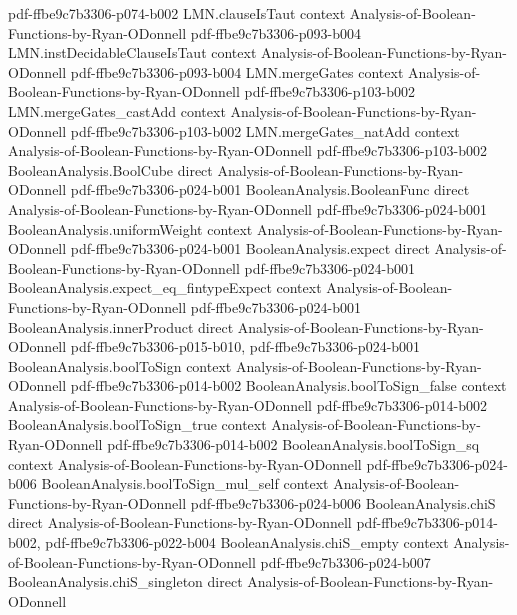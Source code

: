 \begin{theorem}
  {pdf-ffbe9c7b3306-p074-b002}
\proofstep
  {LMN.clauseIsTaut}
  {context}
  {Analysis-of-Boolean-Functions-by-Ryan-ODonnell}
  {pdf-ffbe9c7b3306-p093-b004}
\proofstep
  {LMN.instDecidableClauseIsTaut}
  {context}
  {Analysis-of-Boolean-Functions-by-Ryan-ODonnell}
  {pdf-ffbe9c7b3306-p093-b004}
\proofstep
  {LMN.mergeGates}
  {context}
  {Analysis-of-Boolean-Functions-by-Ryan-ODonnell}
  {pdf-ffbe9c7b3306-p103-b002}
\proofstep
  {LMN.mergeGates_castAdd}
  {context}
  {Analysis-of-Boolean-Functions-by-Ryan-ODonnell}
  {pdf-ffbe9c7b3306-p103-b002}
\proofstep
  {LMN.mergeGates_natAdd}
  {context}
  {Analysis-of-Boolean-Functions-by-Ryan-ODonnell}
  {pdf-ffbe9c7b3306-p103-b002}
\proofstep
  {BooleanAnalysis.BoolCube}
  {direct}
  {Analysis-of-Boolean-Functions-by-Ryan-ODonnell}
  {pdf-ffbe9c7b3306-p024-b001}
\proofstep
  {BooleanAnalysis.BooleanFunc}
  {direct}
  {Analysis-of-Boolean-Functions-by-Ryan-ODonnell}
  {pdf-ffbe9c7b3306-p024-b001}
\proofstep
  {BooleanAnalysis.uniformWeight}
  {context}
  {Analysis-of-Boolean-Functions-by-Ryan-ODonnell}
  {pdf-ffbe9c7b3306-p024-b001}
\proofstep
  {BooleanAnalysis.expect}
  {direct}
  {Analysis-of-Boolean-Functions-by-Ryan-ODonnell}
  {pdf-ffbe9c7b3306-p024-b001}
\proofstep
  {BooleanAnalysis.expect_eq_fintypeExpect}
  {context}
  {Analysis-of-Boolean-Functions-by-Ryan-ODonnell}
  {pdf-ffbe9c7b3306-p024-b001}
\proofstep
  {BooleanAnalysis.innerProduct}
  {direct}
  {Analysis-of-Boolean-Functions-by-Ryan-ODonnell}
  {pdf-ffbe9c7b3306-p015-b010,
    pdf-ffbe9c7b3306-p024-b001}
\proofstep
  {BooleanAnalysis.boolToSign}
  {context}
  {Analysis-of-Boolean-Functions-by-Ryan-ODonnell}
  {pdf-ffbe9c7b3306-p014-b002}
\proofstep
  {BooleanAnalysis.boolToSign_false}
  {context}
  {Analysis-of-Boolean-Functions-by-Ryan-ODonnell}
  {pdf-ffbe9c7b3306-p014-b002}
\proofstep
  {BooleanAnalysis.boolToSign_true}
  {context}
  {Analysis-of-Boolean-Functions-by-Ryan-ODonnell}
  {pdf-ffbe9c7b3306-p014-b002}
\proofstep
  {BooleanAnalysis.boolToSign_sq}
  {context}
  {Analysis-of-Boolean-Functions-by-Ryan-ODonnell}
  {pdf-ffbe9c7b3306-p024-b006}
\proofstep
  {BooleanAnalysis.boolToSign_mul_self}
  {context}
  {Analysis-of-Boolean-Functions-by-Ryan-ODonnell}
  {pdf-ffbe9c7b3306-p024-b006}
\proofstep
  {BooleanAnalysis.chiS}
  {direct}
  {Analysis-of-Boolean-Functions-by-Ryan-ODonnell}
  {pdf-ffbe9c7b3306-p014-b002,
    pdf-ffbe9c7b3306-p022-b004}
\proofstep
  {BooleanAnalysis.chiS_empty}
  {context}
  {Analysis-of-Boolean-Functions-by-Ryan-ODonnell}
  {pdf-ffbe9c7b3306-p024-b007}
\proofstep
  {BooleanAnalysis.chiS_singleton}
  {direct}
  {Analysis-of-Boolean-Functions-by-Ryan-ODonnell}

\end{theorem}
